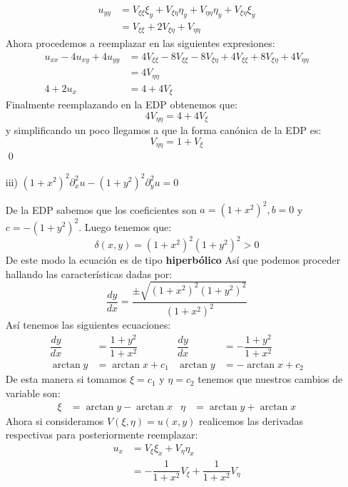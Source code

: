 \begin{homeworkProblem}
\begin{itemize}
\begin{solucion}
\begin{align*}
                  u_{yy}&=V_{\xi\xi}\xi_y+V_{\xi\eta}\eta_y+V_{\eta\eta}\eta_y+V_{\xi\eta}\xi_y\\
                &=V_{\xi\xi}+2V_{\xi\eta}+V_{\eta\eta}
            \end{align*}
            Ahora procedemos a reemplazar en las siguientes expresiones:
            \begin{align*}
                u_{xx}-4u_{xy}+4u_{yy}&=4V_{\xi\xi}-8V_{\xi\xi}-8V_{\xi\eta}+4V_{\xi\xi}+8V_{\xi\eta}+4V_{\eta\eta}\\
                &=4V_{\eta\eta}\\
                4+2u_x&=4+4V_\xi
            \end{align*}
            Finalmente reemplazando en la EDP obtenemos que:
            $$4V_{\eta\eta}=4+4V_\xi$$
            y simplificando un poco llegamos a que la forma canónica de la EDP es:
            $$V_{\eta\eta}=1+V_\xi$$
            \qed
        \end{solucion}
        \item [iii)]$(1+x^2)^2\partial^2_xu-(1+y^2)^2\partial^2_yu=0$
        \begin{solucion}
            De la EDP sabemos que los coeficientes son $a=(1+x^2)^2, b=0$ y $c=-(1+y^2)^2.$ Luego tenemos que:
            $$\delta(x,y)=(1+x^2)^2(1+y^2)^2>0$$
            De este modo la ecuación es de tipo \textbf{hiperbólico} Así que  podemos proceder hallando las características dadas por:
            $$ \dfrac{dy}{dx}=\dfrac{\pm\sqrt{(1+x^2)^2(1+y^2)^2}}{(1+x^2)^2}$$
            Así tenemos las siguientes ecuaciones:
            \begin{align*}
                \dfrac{dy}{dx}&=\dfrac{1+y^2}{1+x^2} &  \dfrac{dy}{dx}&=-\dfrac{1+y^2}{1+x^2}\\
                \arctan y&=\arctan x +c_1 & \arctan y&=-\arctan x +c_2
            \end{align*}
            De esta manera si tomamos $\xi=c_1$ y $\eta=c_2$ tenemos que nuestros cambios de variable son:
            \begin{align*}
                \xi&=\arctan y-\arctan x & \eta&=\arctan y+\arctan x
            \end{align*}
            Ahora si consideramos $V(\xi,\eta)=u(x,y)$ realicemos las derivadas respectivas para posteriormente reemplazar:
            \begin{align*}
                u_x&=V_\xi \xi_x+V_\eta \eta_x\\
                &=-\dfrac{1}{1+x^2}V_\xi+\dfrac{1}{1+x^2}V_\eta\\

\end{align*}
\end{solucion}
\end{itemize}
\end{homeworkProblem}
